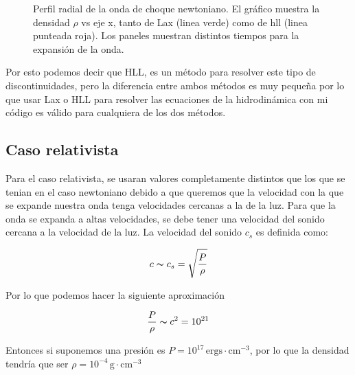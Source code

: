 \documentclass[12pt,a4paper]{book}
\begin{document}
\begin{figure}
\caption{\label{fig:Perfil_radial_newtoniano}Perfil radial de la onda de choque newtoniano. El gráfico muestra la densidad $\rho$ vs eje x, tanto de Lax (linea verde) como de hll (linea punteada roja). Los paneles muestran distintos tiempos para la expansión de la onda.}  
\end{figure}



Por esto podemos decir que HLL, es un método para resolver este tipo de discontinuidades, pero la diferencia entre ambos métodos es muy pequeña por lo que usar Lax o HLL para resolver las ecuaciones de la hidrodinámica con mi código es válido para cualquiera de los dos métodos.


\subsection{Caso relativista} \label{subs:caso_relativista}


Para el caso relativista, se usaran valores completamente distintos que los que se tenian en el caso newtoniano debido a que queremos que la velocidad con la que se expande nuestra onda tenga velocidades cercanas a la de la luz. Para que la onda se expanda a altas velocidades, se debe tener una velocidad del sonido cercana a la velocidad de la luz. La velocidad del sonido $c_s$ es definida como:



\begin{equation}
c \thicksim c_s = \sqrt{\frac{P}{\rho}}
\end{equation}

Por lo que podemos hacer la siguiente aproximación

\begin{equation}
\frac{P}{\rho} \thicksim c^2 = 10^{21}
\end{equation}

Entonces si suponemos una presión es $P = 10^{17} \, \mathrm{ergs} \cdot \mathrm{cm}^{-3}$, por lo que la densidad tendría que ser $\rho = 10^{-4} \, \mathrm{g}\cdot \mathrm{cm}^{-3}$
\end{document}
